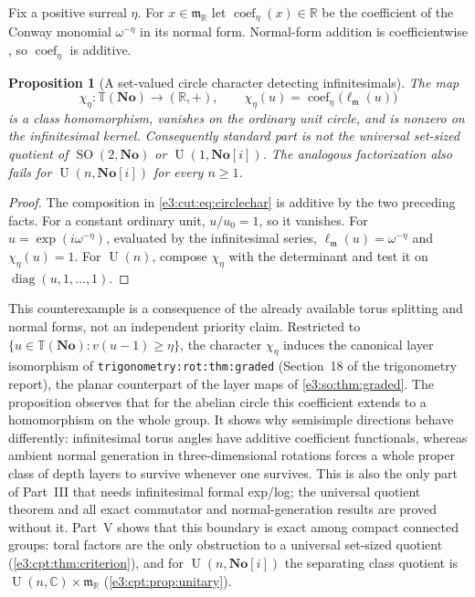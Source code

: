 \documentclass[11pt,letterpaper]{article}
\numberwithin{equation}{section}
\newtheorem{proposition}[proposition]{Proposition}
\theoremstyle{definition}
\theoremstyle{remark}
\newcommand{\No}{\mathbf{No}}
\newcommand{\R}{\mathbb R}
\newcommand{\C}{\mathbb C}
\newcommand{\TT}{\mathbb T}
\newcommand{\mm}{\mathfrak m}
\newcommand{\SO}{\operatorname{SO}}
\newcommand{\diag}{\operatorname{diag}}
\newcommand{\Un}{\operatorname{U}}
\newcommand{\coef}{\operatorname{coef}}
\begin{document}
Fix a positive surreal $\eta$. For $x\in\mm_{\R}$ let $\coef_\eta(x)\in\R$ be the
coefficient of the Conway monomial $\omega^{-\eta}$ in its normal form. Normal-form
addition is coefficientwise \cite[Theorem~2.6]{BG}, so $\coef_\eta$ is
additive.

\begin{proposition}[A set-valued circle character detecting infinitesimals]\label{e3:cut:prop:circlecounter}
The map
\begin{equation}\label{e3:cut:eq:circlechar}
 \chi_\eta:\TT(\No)\longrightarrow(\R,+),\qquad
 \chi_\eta(u)=\coef_\eta\bigl(\ell_{\mm}(u)\bigr)
\end{equation}
is a class homomorphism, vanishes on the ordinary unit circle, and is nonzero on
the infinitesimal kernel. Consequently standard part is not the universal
set-sized quotient of $\SO(2,\No)$ or $\Un(1,\No[i])$. The analogous
factorization also fails for $\Un(n,\No[i])$ for every $n\ge1$.
\end{proposition}
\begin{proof}
The composition in \cref{e3:cut:eq:circlechar} is additive by the two preceding
facts. For a constant ordinary unit, $u/u_0=1$, so it vanishes. For
$u=\exp(i\omega^{-\eta})$, evaluated by the infinitesimal series,
$\ell_{\mm}(u)=\omega^{-\eta}$ and $\chi_\eta(u)=1$. For $\Un(n)$, compose
$\chi_\eta$ with the determinant and test it on $\diag(u,1,\ldots,1)$.
\end{proof}

This counterexample is a consequence of the already available torus splitting
and normal forms, not an independent priority claim. Restricted to
$\{u\in\TT(\No):v(u-1)\ge\eta\}$, the character $\chi_\eta$ induces the
canonical layer isomorphism of \texttt{trigonometry:rot:thm:graded} (Section~18
of the trigonometry report), the planar counterpart of the layer maps of
\cref{e3:so:thm:graded}. The proposition observes that for the abelian circle
this coefficient extends to a homomorphism on the whole group. It shows why semisimple directions behave differently: infinitesimal
torus angles have additive coefficient functionals, whereas ambient normal
generation in three-dimensional rotations forces a whole proper class of depth
layers to survive whenever one survives. This is also the only part of Part~III
that needs infinitesimal formal exp/log; the universal quotient theorem and all
exact commutator and normal-generation results are proved without it. Part~V
shows that this boundary is exact among compact connected groups: toral factors
are the only obstruction to a universal set-sized quotient
(\cref{e3:cpt:thm:criterion}), and for $\Un(n,\No[i])$ the separating class
quotient is $\Un(n,\C)\times\mm_{\R}$ (\cref{e3:cpt:prop:unitary}).
\end{document}
